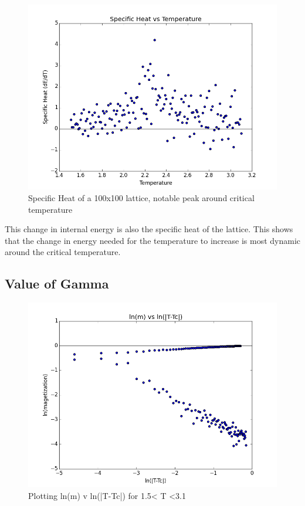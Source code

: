 \documentclass[a4paper,twoside,12pt]{article}
\begin{document}
\begin{figure}[h]
\centering
\includegraphics[scale=0.5]{Figures/dEdT.png}
\caption{Specific Heat of a 100x100 lattice, notable peak around critical temperature}
\label{fig:dEdT}
\end{figure} 

\noindent This change in internal energy is also the specific heat of the lattice. This shows that the change in energy needed for the temperature to increase is most dynamic around the critical temperature.

\subsection{Value of Gamma}

\begin{figure}[h]
\centering
\includegraphics[scale=0.5]{Figures/gamma.png}
\caption{Plotting ln(m) v ln(|T-Tc|) for 1.5< T <3.1}
\label{fig:gamma}
\end{figure} 
\end{document}
